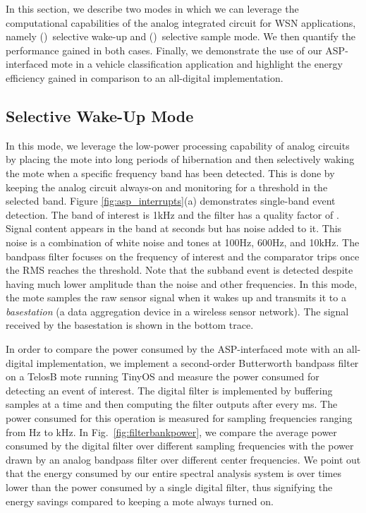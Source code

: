 



In this section, we describe two modes in which we can leverage the computational capabilities of the analog integrated circuit for WSN applications, namely ()~selective wake-up and ()~selective sample mode.  We then quantify the performance gained in both cases. Finally, we demonstrate the use of our ASP-interfaced mote in a vehicle classification application and highlight the energy efficiency gained in comparison to an all-digital implementation.




\subsection{Selective Wake-Up Mode}
In this mode, we leverage the low-power processing capability of analog circuits by placing the mote into long periods of hibernation and then selectively waking the mote when a specific frequency band has been detected. This is done by keeping the analog circuit always-on and monitoring for a threshold in the selected band. Figure \ref{fig:asp_interrupts}(a) demonstrates single-band event detection.  The band of interest is 1kHz and the filter has a quality factor of .  Signal content appears in the band at  seconds but has noise added to it.  This noise is a combination of white noise and tones at 100Hz, 600Hz, and 10kHz. The bandpass filter focuses on the frequency of interest and the comparator trips once the RMS reaches the threshold.   Note that the subband event is detected despite having much lower amplitude than the noise and other frequencies.  In this mode, the mote samples the raw sensor signal when it wakes up and transmits it to a {\em basestation} (a data aggregation device in a wireless sensor network).  The signal received by the basestation is shown in the bottom trace. 



In order to compare the power consumed by the ASP-interfaced mote with an all-digital implementation, we implement a second-order Butterworth bandpass filter on a TelosB mote running TinyOS and measure the power consumed for detecting an event of interest. The digital filter is implemented by buffering  samples at a time and then computing the filter outputs after every ms.  The power consumed for this operation is measured for sampling frequencies ranging from Hz to kHz. In Fig.~\ref{fig:filterbankpower}, we compare the average power consumed by the digital filter over different sampling frequencies with the power drawn by an analog bandpass filter over different center frequencies. We point out that the energy consumed by our entire spectral analysis system is over  times lower than the power consumed by a single digital filter, thus signifying the energy savings compared to keeping a mote always turned on. 





